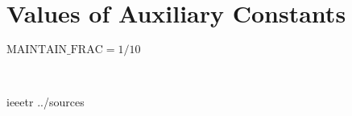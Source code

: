 \documentclass[12pt]{article}
\begin{document}
\newpage



~\newpage

\section{Values of Auxiliary Constants}

$\text{MAINTAIN\_FRAC} = 1/10$

~\newpage

 {ieeetr}
 {../sources}



\end{document}

